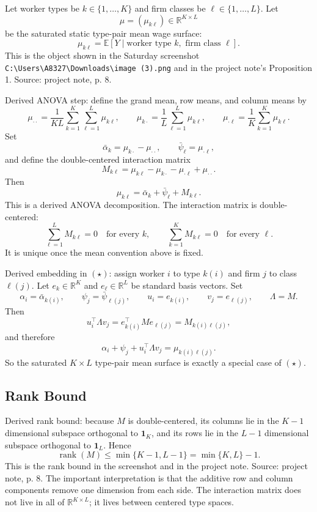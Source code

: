 \documentclass[11pt]{article}
\newcommand{\E}{\mathbb{E}}
\newcommand{\1}{\mathbf{1}}
\begin{document}
Let worker types be $k\in\{1,\ldots,K\}$ and firm classes be
$\ell\in\{1,\ldots,L\}$. Let
\[
\mu=(\mu_{k\ell})\in\mathbb R^{K\times L}
\]
be the saturated static type-pair mean wage surface:
\[
\mu_{k\ell}
=
\E[Y\mid \text{worker type }k,\text{ firm class }\ell].
\]
This is the object shown in the Saturday screenshot
\texttt{C:\textbackslash Users\textbackslash A8327\textbackslash Downloads\textbackslash image (3).png}
and in the project note's Proposition 1. Source: project note, p. 8.

Derived ANOVA step: define the grand mean, row means, and column means by
\[
\mu_{\cdot\cdot}
=
\frac{1}{KL}\sum_{k=1}^K\sum_{\ell=1}^L\mu_{k\ell},
\qquad
\mu_{k\cdot}
=
\frac{1}{L}\sum_{\ell=1}^L\mu_{k\ell},
\qquad
\mu_{\cdot\ell}
=
\frac{1}{K}\sum_{k=1}^K\mu_{k\ell}.
\]
Set
\[
\bar\alpha_k=\mu_{k\cdot}-\mu_{\cdot\cdot},
\qquad
\bar\psi_\ell=\mu_{\cdot\ell},
\]
and define the double-centered interaction matrix
\[
M_{k\ell}
=
\mu_{k\ell}-\mu_{k\cdot}-\mu_{\cdot\ell}+\mu_{\cdot\cdot}.
\]
Then
\[
\mu_{k\ell}
=
\bar\alpha_k+\bar\psi_\ell+M_{k\ell}.
\]
This is a derived ANOVA decomposition. The interaction matrix is double-centered:
\[
\sum_{\ell=1}^L M_{k\ell}=0\quad\text{for every }k,
\qquad
\sum_{k=1}^K M_{k\ell}=0\quad\text{for every }\ell.
\]
It is unique once the mean convention above is fixed.

Derived embedding in $(\star)$: assign worker $i$ to type $k(i)$ and firm $j$ to class $\ell(j)$. Let
$e_k\in\mathbb R^K$ and $e_\ell\in\mathbb R^L$ be standard basis vectors. Set
\[
\alpha_i=\bar\alpha_{k(i)},
\qquad
\psi_j=\bar\psi_{\ell(j)},
\qquad
u_i=e_{k(i)},
\qquad
v_j=e_{\ell(j)},
\qquad
\Lambda=M.
\]
Then
\[
u_i^\top\Lambda v_j
=
e_{k(i)}^\top M e_{\ell(j)}
=
M_{k(i)\ell(j)},
\]
and therefore
\[
\alpha_i+\psi_j+u_i^\top\Lambda v_j
=
\mu_{k(i)\ell(j)}.
\]
So the saturated $K\times L$ type-pair mean surface is exactly a special case of
$(\star)$.

\subsection{Rank Bound}

Derived rank bound: because $M$ is double-centered, its columns lie in the $K-1$ dimensional
subspace orthogonal to $\1_K$, and its rows lie in the $L-1$ dimensional
subspace orthogonal to $\1_L$. Hence
\[
\operatorname{rank}(M)
\leq
\min\{K-1,L-1\}
=
\min\{K,L\}-1.
\]
This is the rank bound in the screenshot and in the project note. Source:
project note, p. 8. The important interpretation is that the additive row and
column components remove one dimension from each side. The interaction matrix
does not live in all of $\mathbb R^{K\times L}$; it lives between centered type
spaces.
\end{document}
